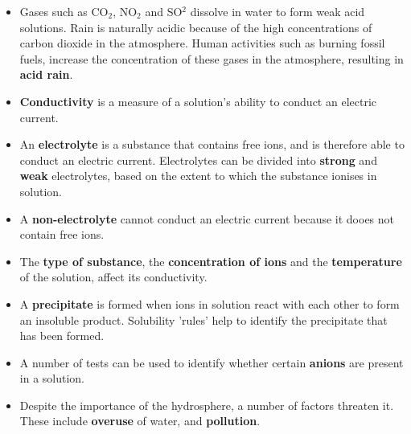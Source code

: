 \begin{itemize}
{A solution with a pH less than 7 is considered acidic and more than 7 is considered basic (or alkaline). A neutral solution has a pH of 7.}
\item{Gases such as CO$_{2}$, NO$_{2}$ and SO$^{2}$ dissolve in water to form weak acid solutions. Rain is naturally acidic because of the high concentrations of carbon dioxide in the atmosphere. Human activities such as burning fossil fuels, increase the concentration of these gases in the atmosphere, resulting in \textbf{acid rain}.}
\item{\textbf{Conductivity} is a measure of a solution's ability to conduct an electric current.}
\item{An \textbf{electrolyte} is a substance that contains free ions, and is therefore able to conduct an electric current. Electrolytes can be divided into \textbf{strong} and \textbf{weak} electrolytes, based on the extent to which the substance ionises in solution.}
\item{A \textbf{non-electrolyte} cannot conduct an electric current because it dooes not contain free ions.}
\item{The \textbf{type of substance}, the \textbf{concentration of ions} and the \textbf{temperature} of the solution, affect its conductivity.}
\item{A \textbf{precipitate} is formed when ions in solution react with each other to form an insoluble product. Solubility 'rules' help to identify the precipitate that has been formed.}
\item{A number of tests can be used to identify whether certain \textbf{anions} are present in a solution.}
\item{Despite the importance of the hydrosphere, a number of factors threaten it. These include \textbf{overuse} of water, and \textbf{pollution}.}
\end{itemize}

